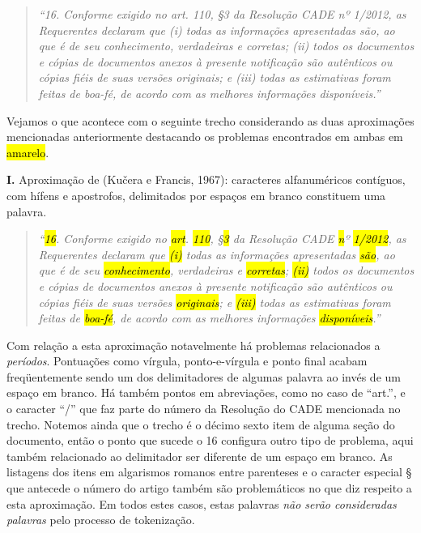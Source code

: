 \documentclass[11pt]{report}
\newcommand{\quotes}[1]{``#1''}
\begin{document}
\begin{quote}
  \textit{\quotes{16. Conforme exigido no art. 110, §3 da Resolução CADE nº 1/2012, as Requerentes declaram que (i) todas as informações apresentadas são, ao que é de seu
  conhecimento, verdadeiras e corretas; (ii) todos os documentos e cópias de documentos anexos à presente notificação são autênticos ou cópias fiéis de suas versões originais;
  e (iii) todas as estimativas foram feitas de boa-fé, de acordo com as melhores informações disponíveis.}}
\end{quote}

Vejamos o que acontece com o seguinte trecho considerando as duas aproximações mencionadas anteriormente destacando os problemas encontrados em ambas em \hl{amarelo}.

\textbf{I.} Aproximação de (Kučera e Francis, 1967): caracteres alfanuméricos contíguos, com hífens e apostrofos, delimitados por espaços em branco constituem uma palavra.

\begin{quote}
  \textit{\quotes{\hl{16}. Conforme exigido no \hl{art}. \hl{110}, §\hl{\mbox{3}} da Resolução CADE \hl{n}º \hl{1/2012}, as Requerentes declaram que \hl{(i)} todas as informações apresentadas \hl{\mbox{são}}, ao que é de seu
  \hl{conhecimento}, verdadeiras e \hl{corretas}; \hl{(ii)} todos os documentos e cópias de documentos anexos à presente notificação são autênticos ou cópias fiéis de suas versões \hl{originais};
  e \hl{(iii)} todas as estimativas foram feitas de \hl{\mbox{boa-fé}}, de acordo com as melhores informações \hl{\mbox{disponíveis}}.}}
\end{quote}

Com relação a esta aproximação notavelmente há problemas relacionados a \textit{períodos}. Pontuações como vírgula, ponto-e-vírgula e ponto final acabam freqüentemente sendo um dos
delimitadores de algumas palavra ao invés de um espaço em branco. Há também pontos em abreviações, como no caso de \quotes{art.}, e o caracter \quotes{/} que faz parte do número da
Resolução do CADE mencionada no trecho. Notemos ainda que o trecho é o décimo sexto item de alguma seção do documento, então o ponto que sucede o 16 configura outro tipo de problema,
aqui também relacionado ao delimitador ser diferente de um espaço em branco. As listagens dos itens em algarismos romanos entre parenteses e o caracter especial § que antecede o número
do artigo também são problemáticos no que diz respeito a esta aproximação. Em todos estes casos, estas palavras \textit{não serão consideradas palavras} pelo processo de tokenização.
\end{document}
